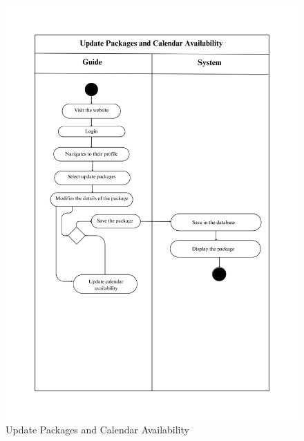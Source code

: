 \begin{figure}[h]
    \centering
    \includegraphics[width=1\textwidth]{Images/Activity Diagrams/15 Update Packages and Calendar Visibility.png}
    \caption{Update Packages and Calendar Availability}
    \label{fig:activity-update-packages}
\end{figure}

